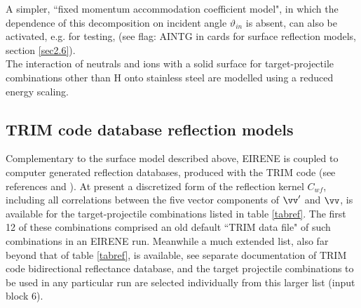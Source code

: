A simpler, ``fixed momentum accommodation coefficient model", in which the dependence of this decomposition
on incident angle $\vartheta_{in} $ is absent, can also be activated, e.g.  for testing, (see flag: AINTG
in cards for surface reflection models, section \ref{sec2.6}).
\\
The interaction of neutrals and ions with a solid surface for
target-projectile combinations other than H onto stainless steel
are modelled using a reduced energy scaling.

\subsection{TRIM code database reflection models} \label{sec1.3.2}
Complementary to the surface model described above, EIRENE is
coupled to computer generated reflection databases, produced with
the TRIM code (see references \cite{kn:Eckstein} and
\cite{kn:Bateman}). At present a discretized form of the
reflection kernel $C_{wf}$, including all correlations between the
five vector components of $ \vv '$ and $\vv $, is
available for the target-projectile combinations listed in table
\ref{tabref}. The first 12 of these combinations
comprised an old default ``TRIM data file" of such combinations in an EIRENE run.
Meanwhile a much extended list,
also far beyond that of table \ref{tabref}, is available, see separate
documentation of TRIM code bidirectional reflectance database,
and the target projectile combinations
to be used in any particular run are selected individually
from this larger list (input block 6).

